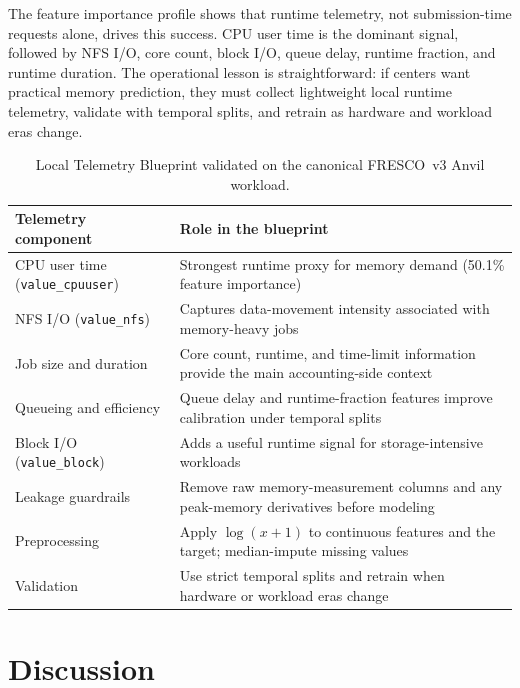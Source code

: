 \documentclass[sigconf]{acmart}
\begin{document}
The feature importance profile shows that runtime telemetry, not submission-time requests alone, drives this success. CPU user time is the dominant signal, followed by NFS I/O, core count, block I/O, queue delay, runtime fraction, and runtime duration. The operational lesson is straightforward: if centers want practical memory prediction, they must collect lightweight local runtime telemetry, validate with temporal splits, and retrain as hardware and workload eras change.

\begin{table}[t]
\caption{Local Telemetry Blueprint validated on the canonical FRESCO~v3 Anvil workload.}
\label{tab:blueprint}
\centering
\footnotesize
\setlength{\tabcolsep}{6pt}
\begin{tabular}{@{}p{}p{}@{}}
\toprule
\textbf{Telemetry component} & \textbf{Role in the blueprint} \\
\midrule
CPU user time (\texttt{value\_cpuuser}) & Strongest runtime proxy for memory demand (50.1\% feature importance) \\
NFS I/O (\texttt{value\_nfs}) & Captures data-movement intensity associated with memory-heavy jobs \\
Job size and duration & Core count, runtime, and time-limit information provide the main accounting-side context \\
Queueing and efficiency & Queue delay and runtime-fraction features improve calibration under temporal splits \\
Block I/O (\texttt{value\_block}) & Adds a useful runtime signal for storage-intensive workloads \\
Leakage guardrails & Remove raw memory-measurement columns and any peak-memory derivatives before modeling \\
Preprocessing & Apply $\log(x+1)$ to continuous features and the target; median-impute missing values \\
Validation & Use strict temporal splits and retrain when hardware or workload eras change \\
\bottomrule
\end{tabular}
\end{table}


\section{Discussion}
\end{document}
